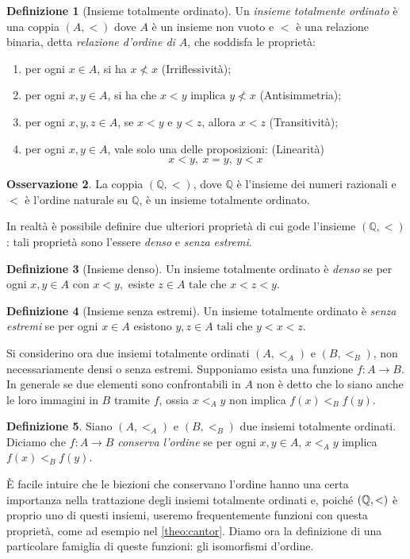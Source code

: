 \documentclass[12pt,a4paper,openright]{report}
\newcommand{\Q}{\mathbb{Q}} %
\newcommand{\0}{\setminus\{0\}} %
\theoremstyle{definition}
\newtheorem{defn}{Definizione}[chapter]
\newtheorem{oss}[defn]{Osservazione}
\theoremstyle{plain}
\begin{document}
\begin{defn}[Insieme totalmente ordinato]
Un \emph{insieme totalmente ordinato} è una coppia $(A,<)$ dove $A$ è un insieme non vuoto e $<$ è una relazione binaria, detta \emph{relazione d'ordine di $A$}, che soddisfa le proprietà:
\begin{enumerate}
\item per ogni $x \in A$, si ha $x \nless x$ (Irriflessività);
\item per ogni $x,y \in A$, si ha che $x<y \mbox{ implica } y \nless x$ (Antisimmetria);
\item per ogni $x,y,z \in A$, se $x<y \mbox{ e } y<z$, allora $x<z$ (Transitività);
\item per ogni $x,y \in A$, vale solo una delle proposizioni: (Linearità)\[x<y,\medspace x=y,\medspace y<x\]
\end{enumerate}
\end{defn}

\begin{oss}
La coppia $(\Q,<)$, dove $\Q$ è l'insieme dei numeri razionali e $<$ è l'ordine naturale su $\Q$, è un insieme totalmente ordinato.
\end{oss}

In realtà è possibile definire due ulteriori proprietà di cui gode l'insieme $(\Q,<)$: tali proprietà sono l'essere \emph{denso} e \emph{senza estremi}.

\begin{defn}[Insieme denso]
Un insieme totalmente ordinato è \emph{denso} se per ogni $x,y \in A$ con $x<y,$ esiste $z \in A \mbox{ tale che } x<z<y$.
\end{defn}
\begin{defn}[Insieme senza estremi]
Un insieme totalmente ordinato è \emph{senza estremi} se per ogni $x \in A$ esistono $y,z \in A \mbox{ tali che } y<x<z$.
\end{defn}

Si considerino ora due insiemi totalmente ordinati $(A,<_A)$ e $(B,<_B)$, non necessariamente densi o senza estremi. Supponiamo esista una funzione $f: A \rightarrow B$.
In generale se due elementi sono confrontabili in $A$ non è detto che lo siano anche le loro immagini in $B$ tramite $f$, ossia $x<_A y$ non implica $f(x)<_B f(y)$.
\begin{defn} Siano $\left(A,<_A\right)$ e $\left(B,<_B\right)$ due insiemi totalmente ordinati. Diciamo che $f:A \rightarrow B$ \emph{conserva l'ordine} se per ogni $x,y \in A$, $x<_A y$ implica $f(x)<_B f(y)$.
\end{defn}
È facile intuire che le biezioni che conservano l'ordine hanno una certa importanza nella trattazione degli insiemi totalmente ordinati e, poiché $(\Q,<\nolinebreak)$ è proprio uno di questi insiemi, useremo frequentemente funzioni con questa proprietà, come ad esempio nel \cref{theo:cantor}. Diamo ora la definizione di una particolare famiglia di queste funzioni: gli isomorfismi d'ordine.
\end{document}
